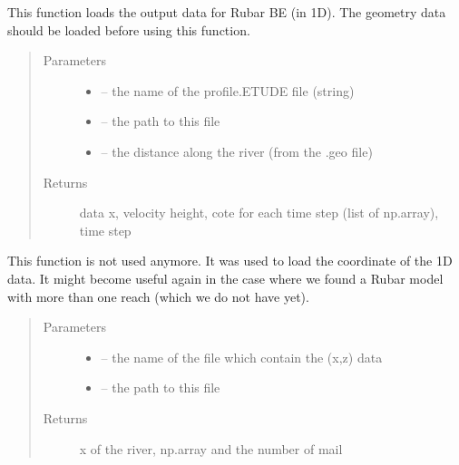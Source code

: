 \documentclass[letterpaper,10pt,english]{sphinxmanual}
\begin{document}

\begin{fulllineitems}
\label{\detokenize{index:src.rubar.load_data_1d}}
This function loads the output data for Rubar BE (in 1D). The geometry data should be loaded before using this function.
\begin{quote}\begin{description}
\item[{Parameters}] \leavevmode\begin{itemize}
\item {} 
 -- the name of the profile.ETUDE file (string)

\item {} 
 -- the path to this file

\item {} 
 -- the distance along the river (from the .geo file)

\end{itemize}

\item[{Returns}] \leavevmode
data x, velocity height, cote for each time step (list of np.array), time step

\end{description}\end{quote}

\end{fulllineitems}


\begin{fulllineitems}
\label{\detokenize{index:src.rubar.load_mai_1d}}
This function is not used anymore. It was used to load the coordinate of the 1D data. It might become useful again
in the case where we found a Rubar model with more than one reach (which we do not have yet).
\begin{quote}\begin{description}
\item[{Parameters}] \leavevmode\begin{itemize}
\item {} 
 -- the name of the file which contain the (x,z) data

\item {} 
 -- the path to this file

\end{itemize}

\item[{Returns}] \leavevmode
x of the river, np.array and the number of mail

\end{description}\end{quote}

\end{fulllineitems}
\end{document}
